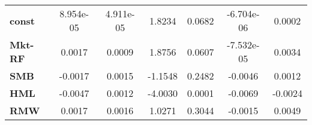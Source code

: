 \begin{center}
\begin{tabular}{lcccccc}
\midrule
\textbf{const}  &     8.954e-05      &     4.911e-05      &      1.8234     &      0.0682      &     -6.704e-06    &       0.0002       \\
\textbf{Mkt-RF} &       0.0017       &       0.0009       &      1.8756     &      0.0607      &     -7.532e-05    &       0.0034       \\
\textbf{SMB}    &      -0.0017       &       0.0015       &     -1.1548     &      0.2482      &      -0.0046      &       0.0012       \\
\textbf{HML}    &      -0.0047       &       0.0012       &     -4.0030     &      0.0001      &      -0.0069      &      -0.0024       \\
\textbf{RMW}    &       0.0017       &       0.0016       &      1.0271     &      0.3044      &      -0.0015      &       0.0049       \\
\bottomrule
\end{tabular}
\end{center}
